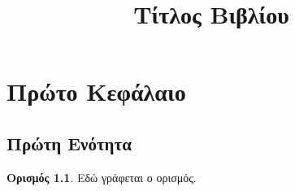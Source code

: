 \documentclass[12pt,a4paper]{book}
\title{Τίτλος Βιβλίου}
\author{}
\date{}
\theoremstyle{plain}
\theoremstyle{definition}
\newtheorem{definition}[theorem]{Ορισμός}
\begin{document}
\maketitle
\tableofcontents

\chapter{Πρώτο Κεφάλαιο}
\section{Πρώτη Ενότητα}

\begin{definition}
Εδώ γράφεται ο ορισμός.
\end{definition}
\end{document}
